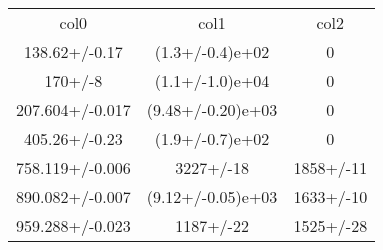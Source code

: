 \begin{table}
\begin{tabular}{ccc}
col0 & col1 & col2 \\
138.62+/-0.17 & (1.3+/-0.4)e+02 & 0 \\
170+/-8 & (1.1+/-1.0)e+04 & 0 \\
207.604+/-0.017 & (9.48+/-0.20)e+03 & 0 \\
405.26+/-0.23 & (1.9+/-0.7)e+02 & 0 \\
758.119+/-0.006 & 3227+/-18 & 1858+/-11 \\
890.082+/-0.007 & (9.12+/-0.05)e+03 & 1633+/-10 \\
959.288+/-0.023 & 1187+/-22 & 1525+/-28 \\
\end{tabular}
\end{table}
